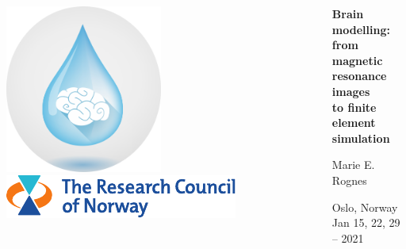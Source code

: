 \documentclass[10pt, mathserif, aspectratio=169, t]{beamer}
\begin{document}
\begin{frame}
\begin{columns}
\begin{column}{0.25\textwidth}
    \vspace{1em}
    \includegraphics[width=0.5\textwidth]{graphics/waterscape_logo.png} \\
    \vspace{1em}
    \includegraphics[width=\textwidth]{graphics/rcn-logo.pdf} \\
    \end{column}
    \begin{column}{0.75\textwidth}
    {
    \centering

      \vspace{4em}

      {\bf Brain modelling: \\ from magnetic resonance images \\ to finite element simulation} \\

      \bigskip
      \bigskip
      

      Marie E. Rognes \\
      \bigskip
      \bigskip

      Oslo, Norway \\
      \medskip
      Jan 15, 22, 29 -- 2021 \\
      }
    \end{column}
  \end{columns}
\end{frame}

\cleanpage
\end{document}
